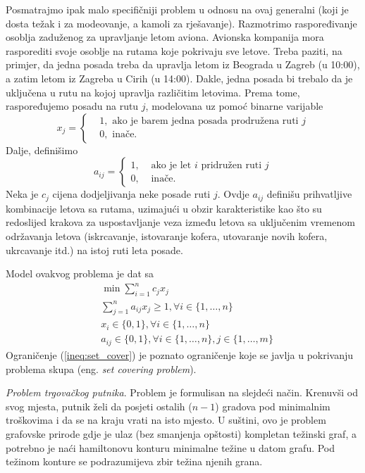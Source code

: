 \documentclass[a4paper, utf8, 11pt, colorlinks]{book}
\begin{document}
Posmatrajmo ipak malo specifičniji problem u odnosu na ovaj generalni (koji je dosta težak i za modeovanje, a kamoli za rješavanje). 
Razmotrimo raspoređivanje osoblja zaduženog za upravljanje letom aviona. 
Avionska kompanija mora rasporediti svoje osoblje na rutama koje pokrivaju sve letove. Treba paziti, na primjer, da jedna posada treba da upravlja letom iz  Beograda u Zagreb (u 10:00), a zatim letom iz Zagreba u Cirih (u 14:00). Dakle, jedna posada bi trebalo da je uključena u rutu na kojoj upravlja različitim letovima. Prema tome, raspoređujemo posadu na rutu $j$, modelovana uz pomoć binarne varijable 
$$x_j = \begin{cases}
    &1, \mbox{ ako je barem jedna posada prodružena ruti } j \\
    &0, \mbox{ inače}. 
\end{cases}
$$
Dalje, definišimo 
$$a_{ij}= \begin{cases}
             1,& \mbox{ ako je let } i \mbox{ pridružen ruti } j \\
             0,& \mbox{ inače}.
        \end{cases}
$$
Neka je $c_j$ cijena dodjeljivanja neke posade ruti $j$. Ovdje $a_{ij}$ definišu prihvatljive kombinacije letova sa rutama, uzimajući u obzir  karakteristike kao što su redoslijed krakova za uspostavljanje veza između letova sa uključenim vremenom  održavanja letova (iskrcavanje, istovaranje kofera, utovaranje novih kofera, ukrcavanje itd.) na istoj ruti leta posade.   

Model ovakvog problema je dat sa 
\begin{align}
    &\min \sum_{i=1}^n c_j x_j \nonumber\\
    & \sum_{j=1}^n a_{ij} x_j \geq 1, \forall i \in \{1,\ldots, n\} \label{ineq:set_cover} \\
    & x_i \in \{0, 1 \}, \forall i \in \{1, \ldots, n\} \\
    & a_{ij} \in \{0, 1\}, \forall i \in \{1, \ldots, n\}, j \in\{1,\ldots, m\} \nonumber
\end{align}
Ograničenje (\ref{ineq:set_cover}) je poznato ograničenje koje se javlja u pokrivanju problema skupa (eng. \emph{set covering problem}).

\emph{Problem trgovačkog putnika}. Problem je formulisan na slejdeći način. Krenuvši od svog mjesta, putnik želi da posjeti ostalih ($n-1$) gradova pod minimalnim troškovima i da se na kraju vrati na isto mjesto. U suštini, ovo je problem grafovske prirode gdje je ulaz (bez smanjenja opštosti) kompletan težinski graf, a potrebno je naći hamiltonovu konturu minimalne težine u datom grafu. Pod težinom konture se podrazumijeva zbir težina njenih grana. 
\end{document}
